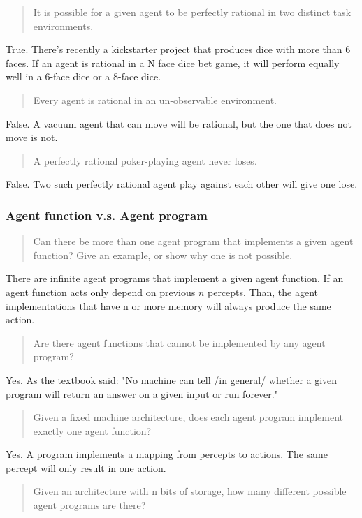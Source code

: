\begin{quote}
It is possible for a given agent to be perfectly rational in two distinct task environments.
\end{quote}

True.  There's recently a kickstarter project that produces dice with
more than 6 faces.  If an agent is rational in a N face dice bet game,
it will perform equally well in a 6-face dice or a 8-face dice.
\begin{quote}
Every agent is rational in an un-observable environment.
\end{quote}
False.  A vacuum agent that can move will be rational, but the one
that does not move is not.

\begin{quote}
A perfectly rational poker-playing agent never loses.
\end{quote}
False.  Two such perfectly rational agent play against each other will
give one lose.
      
\subsubsection{Agent function v.s. Agent program}
\begin{quote}
Can there be more than one agent program that implements a given agent
function? Give an example, or show why one is not possible.
\end{quote}
There are infinite agent programs that implement a given agent
function.  If an agent function acts only depend on previous $n$
percepts.  Than, the agent implementations that have n or more memory
will always produce the same action.

\begin{quote}
Are there agent functions that cannot be implemented by any agent program?
\end{quote}

Yes. As the textbook said: "No machine can tell /in general/ whether a
given program will return an answer on a given input or run forever."

\begin{quote}
  Given a fixed machine architecture, does each agent program
  implement exactly one agent function?
\end{quote}

Yes. A program implements a mapping from percepts to actions.  The
same percept will only result in one action.

\begin{quote}
  Given an architecture with n bits of storage, how many different
  possible agent programs are there?
\end{quote}

